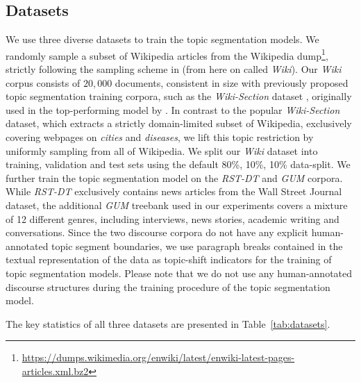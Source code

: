\documentclass[letterpaper]{article} %
\begin{document}
\subsection{Datasets} 
\label{sec:datasets}
We use three diverse datasets to train the topic segmentation models. We randomly sample a subset of Wikipedia articles from the Wikipedia dump\footnote{\url{https://dumps.wikimedia.org/enwiki/latest/enwiki-latest-pages-articles.xml.bz2}}, strictly following the sampling scheme in \citet{koshorek-etal-2018-text} (from here on called \textit{Wiki}). Our \textit{Wiki} corpus consists of $20,000$ documents, consistent in size with previously proposed topic segmentation training corpora, such as the \textit{Wiki-Section} dataset \cite{arnold-etal-2019-sector}, originally used in the top-performing model by \citet{xing-etal-2020-improving}. In contrast to the popular \textit{Wiki-Section} dataset, which extracts a strictly domain-limited subset of Wikipedia, exclusively covering webpages on \textit{cities} and \textit{diseases}, we lift this topic restriction by uniformly sampling from all of Wikipedia. We split our \textit{Wiki} dataset into training, validation and test sets using the default 80\%, 10\%, 10\% data-split. We further train the topic segmentation model on the \textit{RST-DT} \cite{carlson2002rst} and \textit{GUM} \cite{Zeldes2017} corpora. While \textit{RST-DT} exclusively contains news articles from the Wall Street Journal dataset, the additional \textit{GUM} treebank used in our experiments covers a mixture of 12 different genres, including interviews, news stories, academic writing and conversations. Since the two discourse corpora do not have any explicit human-annotated topic segment boundaries, we use paragraph breaks contained in the textual representation of the data as topic-shift indicators for the training of topic segmentation models. Please note that we do not use any human-annotated discourse structures during the training procedure of the topic segmentation model. 

The key statistics of all three datasets are presented in Table~\ref{tab:datasets}.
\end{document}

